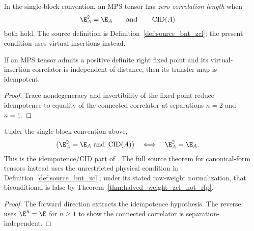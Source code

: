 \begin{definition}\label{def:is_zcl}
    \leanok
    In the single-block convention, an MPS tensor has \emph{zero correlation
        length} when
    \[
        \E_A^2=\E_A
        \qquad\text{and}\qquad
        \operatorname{CID}(A)
    \]
    both hold. The source definition is
    Definition~\ref{def:source_bnt_zcl}; the present condition uses virtual
    insertions instead.
\end{definition}

\begin{theorem}%
    \label{thm:isCID_implies_isTransferIdempotent}
    \leanok
    If an MPS tensor admits a positive definite right fixed point and its
    virtual-insertion correlator is independent of distance, then its transfer
    map is idempotent.
\end{theorem}
\begin{proof}\leanok
    Trace nondegeneracy and invertibility of the fixed point reduce
    idempotence to equality of the connected correlator at separations
    $n=2$ and $n=1$.
\end{proof}

\begin{theorem}%
    \label{thm:zcl_iff_idempotent_transfer}
    \leanok
    Under the single-block convention above,
    \[
        \bigl(\E_A^2=\E_A \ \text{and}\ \operatorname{CID}(A)\bigr)
        \quad\Longleftrightarrow\quad
        \E_A^2=\E_A .
    \]
    This is the idempotence/CID part of
    \cite[Theorem~3.8]{Cirac2016MPDO_arXiv}. The full source theorem for
    canonical-form tensors instead uses the unrestricted physical condition in
    Definition~\ref{def:source_bnt_zcl}; under its stated raw-weight
    normalization, that biconditional is false by
    Theorem~\ref{thm:halved_weight_zcl_not_rfp}.
\end{theorem}
\begin{proof}\leanok
    The forward direction extracts the idempotence hypothesis. The reverse uses
    $\E^n = \E$ for $n \ge 1$ to show the connected correlator is
    separation-independent.
\end{proof}

